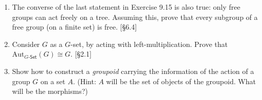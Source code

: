 \begin{enumerate}
      \item The converse of the last statement in Exercise 9.15 is also true: only free groups can act freely on a tree. Assuming this, prove that every subgroup of a free group (on a finite set) is free. [\S6.4]

      \item {
            Consider $G$ as a $G$-set, by acting with left-multiplication. Prove that $\text{Aut}_{G\text{-}\mathsf{Set}}(G) \cong G$. [\S2.1]
            \par}

      \item Show how to construct a \emph{groupoid} carrying the information of the action of a group $G$ on a set $A$. (Hint: $A$ will be the set of objects of the groupoid. What will be the morphisms?)
\end{enumerate}